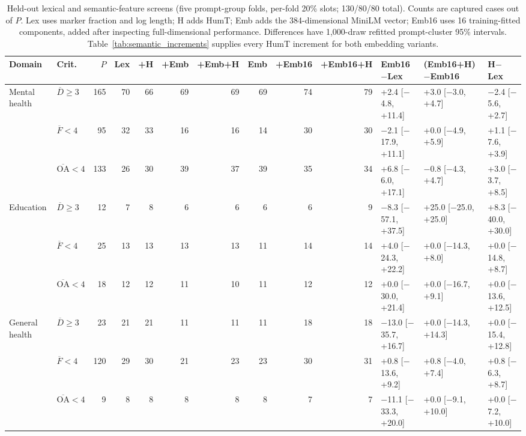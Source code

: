 \begin{table}[t]
\centering\scriptsize\setlength{\tabcolsep}{3.5pt}
\caption{Held-out lexical and semantic-feature screens (five prompt-group folds, per-fold 20\% slots; 130/80/80 total). Counts are captured cases out of $P$. Lex uses marker fraction and log length; H adds HumT; Emb adds the 384-dimensional MiniLM vector; Emb16 uses 16 training-fitted components, added after inspecting full-dimensional performance. Differences have 1,000-draw refitted prompt-cluster 95\% intervals. Table~\ref{tab:semantic_increments} supplies every HumT increment for both embedding variants.}
\label{tab:semantic_heldout}
\begin{tabular}{llrrrrrrrrlll}
\toprule
Domain & Crit. & $P$ & Lex & +H & +Emb & +Emb+H & Emb & +Emb16 & +Emb16+H & Emb16$-$Lex & (Emb16+H)$-$Emb16 & H$-$Lex \\
\midrule
Mental health & $\overline D\geq3$ & 165 & 70 & 66 & 69 & 69 & 69 & 74 & 79 & +2.4 [\ensuremath{-}4.8, +11.4] & +3.0 [\ensuremath{-}3.0, +4.7] & \ensuremath{-}2.4 [\ensuremath{-}5.6, +2.7] \\
 & $\overline F<4$ & 95 & 32 & 33 & 16 & 16 & 14 & 30 & 30 & \ensuremath{-}2.1 [\ensuremath{-}17.9, +11.1] & +0.0 [\ensuremath{-}4.9, +5.9] & +1.1 [\ensuremath{-}7.6, +3.9] \\
 & $\overline{\mathrm{OA}}<4$ & 133 & 26 & 30 & 39 & 37 & 39 & 35 & 34 & +6.8 [\ensuremath{-}6.0, +17.1] & \ensuremath{-}0.8 [\ensuremath{-}4.3, +4.7] & +3.0 [\ensuremath{-}3.7, +8.5] \\
\addlinespace
Education & $\overline D\geq3$ & 12 & 7 & 8 & 6 & 6 & 6 & 6 & 9 & \ensuremath{-}8.3 [\ensuremath{-}57.1, +37.5] & +25.0 [\ensuremath{-}25.0, +25.0] & +8.3 [\ensuremath{-}40.0, +30.0] \\
 & $\overline F<4$ & 25 & 13 & 13 & 13 & 13 & 11 & 14 & 14 & +4.0 [\ensuremath{-}24.3, +22.2] & +0.0 [\ensuremath{-}14.3, +8.0] & +0.0 [\ensuremath{-}14.8, +8.7] \\
 & $\overline{\mathrm{OA}}<4$ & 18 & 12 & 12 & 11 & 10 & 11 & 12 & 12 & +0.0 [\ensuremath{-}30.0, +21.4] & +0.0 [\ensuremath{-}16.7, +9.1] & +0.0 [\ensuremath{-}13.6, +12.5] \\
\addlinespace
General health & $\overline D\geq3$ & 23 & 21 & 21 & 11 & 11 & 11 & 18 & 18 & \ensuremath{-}13.0 [\ensuremath{-}35.7, +16.7] & +0.0 [\ensuremath{-}14.3, +14.3] & +0.0 [\ensuremath{-}15.4, +12.8] \\
 & $\overline F<4$ & 120 & 29 & 30 & 21 & 23 & 23 & 30 & 31 & +0.8 [\ensuremath{-}13.6, +9.2] & +0.8 [\ensuremath{-}4.0, +7.4] & +0.8 [\ensuremath{-}6.3, +8.7] \\
 & $\overline{\mathrm{OA}}<4$ & 9 & 8 & 8 & 8 & 8 & 8 & 7 & 7 & \ensuremath{-}11.1 [\ensuremath{-}33.3, +20.0] & +0.0 [\ensuremath{-}9.1, +10.0] & +0.0 [\ensuremath{-}7.2, +10.0] \\
\bottomrule
\end{tabular}
\end{table}
